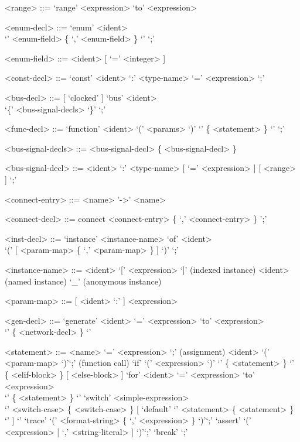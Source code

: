 \documentclass{article}
\begin{document}
\begin{grammar}
  <range> ::= `range' <expression> `to' <expression>

  <enum-decl> ::= `enum' <ident> \\ `{' <enum-field> \{ `,' <enum-field>  \} `}' `;'

  <enum-field> ::= <ident> [ `=' <integer> ]
  
  <const-decl> ::= `const' <ident> `:' <type-name> `=' <expression> `;'

  <bus-decl> ::= [ `clocked' ] `bus' <ident> \\ `\{' <bus-signal-decls> `\}'  `;'

  <func-decl> ::= `function' <ident> `(' <params> `)' `{' \{ <statement> \}  `}' `;'

  <bus-signal-decls> ::= <bus-signal-decl> \{ <bus-signal-decl> \}

  <bus-signal-decl> ::= <ident> `:' <type-name> [ `=' <expression> ] [ <range> ] `;'

  <connect-entry> ::= <name> '->' <name>

  <connect-decl> ::= connect <connect-entry> \{ `,' <connect-entry> \} ';'

  <inst-decl> ::= `instance' <instance-name> `of' <ident> \\`(' [ <param-map> 
  \{ `,' <param-map> \} ] `)' `;'

  <instance-name> ::= <ident> `[' <expression> `]' (indexed instance)
  \alt <ident> (named instance)
  \alt `_' (anonymous instance)

  <param-map> ::= [ <ident> `:' ] <expression>

  <gen-decl> ::= `generate' <ident> `=' <expression> `to' <expression> \\ `{' \{ <network-decl> \} `}'

  <statement> ::= <name> `=' <expression> `;' (assignment)
  \alt <ident> `(' <param-map> `)'`;' (function call) 
  \alt `if' `(' <expression> `)' `{' \{ <statement> \} `}' \\ \{ <elif-block>
    \} [ <else-block> ]
  \alt `for' <ident> `=' <expression> `to' <expression> \\ `{' \{ <statement> \} `}'
  \alt `switch' <simple-expression> \\ `{' <switch-case> \{ <switch-case> \} [ `default' `{' <statement> \{ <statement> \} `}' ] `}'
  \alt `trace' `(' <format-string> \{ `,' <expression> \} `)'`;'
  \alt `assert' `(' <expression> [ `,' <string-literal> ] `)'`;'
  \alt `break' `;'


\end{grammar}
\end{document}
